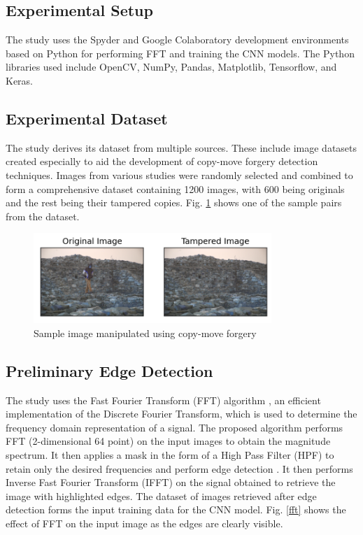 \documentclass[conference]{IEEEtran}
\begin{document}
\subsection{Experimental Setup}
The study uses the Spyder and Google Colaboratory development environments based on Python for performing FFT and training the CNN models. The Python libraries used include OpenCV, NumPy, Pandas, Matplotlib, Tensorflow, and Keras.  

\subsection{Experimental Dataset}
The study derives its dataset from multiple sources. These include image datasets created especially to aid the development of copy-move forgery detection techniques. Images from various studies \cite{b4}  \cite{b5} \cite{b7} were randomly selected and combined to form a comprehensive dataset containing 1200 images, with 600 being originals and the rest being their tampered copies. Fig. \ref{tampered} shows one of the sample pairs from the dataset.

\begin{figure}[htpb]
\centerline{\includegraphics[width = 9cm]{tamp_up.png}}
\caption{Sample image manipulated using copy-move forgery}
\label{tampered}
\end{figure}

\subsection{Preliminary Edge Detection}
The study uses the Fast Fourier Transform (FFT) algorithm \cite{b10}, an efficient implementation of the Discrete Fourier Transform, which is used to determine the frequency domain representation of a signal. The proposed algorithm performs FFT (2-dimensional 64 point) on the input images to obtain the magnitude spectrum. It then applies a mask in the form of a High Pass Filter (HPF) to retain only the desired frequencies and perform edge detection \cite{b15}. It then performs Inverse Fast Fourier Transform (IFFT) on the signal obtained to retrieve the image with highlighted edges. The dataset of images retrieved after edge detection forms the input training data for the CNN model. Fig. \ref{fft} shows the effect of FFT on the input image as the edges are clearly visible.
\end{document}
